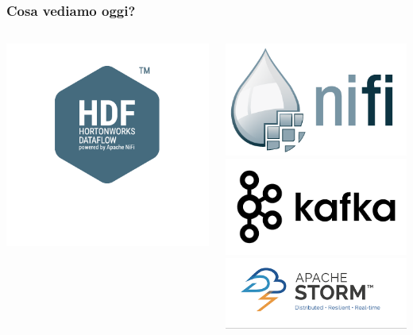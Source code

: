 \begin{frame}
\frametitle{Cosa vediamo oggi?}
\begin{columns}
	\begin{column}{0.5\textwidth}
		\includegraphics[scale=0.4]{img/icon-hdf}
	\end{column}
	\begin{column}{0.5\textwidth}
		\includegraphics[scale=0.2]{img/nifi-logo}\\
		\includegraphics[scale=0.2]{img/kafka-logo}\\
		\includegraphics[scale=0.2]{img/storm-logo}
	\end{column}
\end{columns}

\end{frame}

